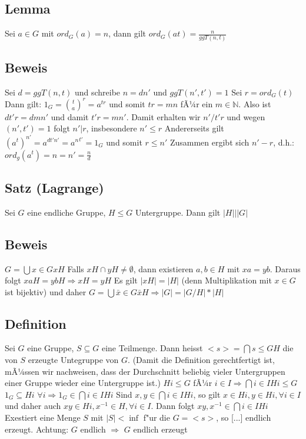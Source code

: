 \documentclass[12pt,a4paper,ngerman]{scrreprt}
\begin{document}
\subsection{Lemma}
Sei $a \in G$ mit $ord_G(a) = n$, dann gilt $ord_G(at) = \frac{n}{ggT(n,t)}$

\subsection{Beweis}
Sei $d = ggT(n,t)$ und schreibe $n = dn'$ und $ggT(n',t') = 1$
Sei $r = ord_G(t)$ %
Dann gilt: $1_G = \binom{t}{a}^r = a^{tr}$ und somit $tr = mn$ fÃ¼r ein $m \in \mathbb{N}$.
Also ist $dt'r = dmn'$ und damit $t'r = mn'$. 
Damit erhalten wir $n'/t'r$ und wegen $(n', t') = 1$ folgt $n'|r$, insbesondere $n' \leq r$
Andererseits gilt $(a^t)^{n'} = a^{dt'n'} = {a^n}^{t'} = 1_G$ und somit $r \leq n'$
Zusammen ergibt sich $n' - r$, d.h.: $ord_g(a^t) = n = n' = \frac{n}{d}$

\subsection{Satz (Lagrange)}
Sei $G$ eine endliche Gruppe, $H \leq G$ Untergruppe. Dann gilt $|H| | |G|$%
\subsection{Beweis}
$G = \bigcup{x\in G}{xH}$ Falls $xH \cap yH \neq \emptyset$, 
dann existieren $a,b \in H$ mit $xa = yb$.
Daraus folgt $xaH = ybH \Rightarrow xH=yH$
Es gilt $|xH| = |H|$ (denn Multiplikation mit $x \in G$ ist bijektiv) und daher
$G = \bigcup{\bar{x} \in G}{\bar{x} H} \Rightarrow |G| = |G/H| * |H|$

\subsection{Definition}
Sei $G$ eine Gruppe, $S \subseteq G$ eine Teilmenge.
Dann heisst $<s> = \bigcap{s \leq G}{H}$ die von $S$ erzeugte Untegruppe von $G$.
(Damit die Definition gerechtfertigt ist, mÃ¼ssen wir nachweisen, dass der Durchschnitt beliebig vieler Untergruppen einer Gruppe wieder eine Untergruppe ist.)
$Hi \leq G$ fÃ¼r $i \in I \Rightarrow \bigcap{i\in I}{Hi} \leq G$
$1_G \subseteq Hi$ 
$\forall i \Rightarrow 1_G \in \bigcap{i\in I}{Hi}$
Sind $x,y \in \bigcap{i\in I} Hi$, so gilt $x \in Hi, y \in Hi, \forall i\in I $
und daher auch
$xy \in Hi, x^{-1} \in H, \forall i \in I$. 
Dann folgt
$xy, x^{-1} \in \bigcap{i\in I}{Hi}$
Exestiert eine Menge $S$ mit $|S| < \inf$ f"ur die $G=<s>$, so [...] endlich erzeugt.
Achtung: $G$ endlich $\Rightarrow$ $G$ endlich erzeugt
\end{document}
